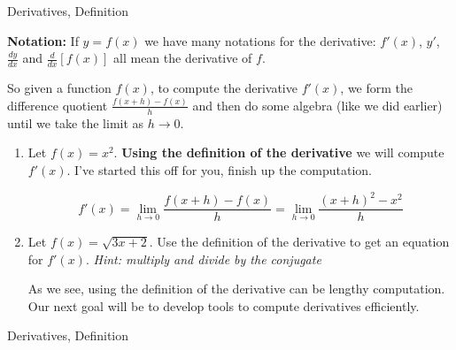 
\begin{tagblock}{Derivatives, Definition}
\begin{question}
	

\bigskip

\textbf{Notation:}  If $y=f(x)$ we have many notations for the derivative:  $f'(x)$, $y'$, $\frac{dy}{dx}$ and $\frac{d}{dx}[f(x)]$ all mean the derivative of $f$.  



So given a function $f(x)$, to compute the derivative $f'(x)$, we form the difference quotient $\displaystyle \frac{f(x+h)-f(x)}{h}$ and then do some algebra (like we did earlier) until we take the limit as $h \to 0$.  





\begin{enumerate}

\item Let $f(x) = x^2$.  \textbf{Using the definition of the derivative} we will compute $f'(x)$.  I've started this off for you, finish up the computation.  

\[f'(x) = \lim_{h \to 0} \frac{f(x+h) - f(x)}{h} =  \lim_{h \to 0} \frac{(x+h)^2 - x^2}{h} \]


\vspace{5in}



\item Let $f(x) = \sqrt{3x+2}$.  Use the definition of the derivative to get an equation for $f'(x)$.  \emph{Hint: multiply and divide by the conjugate}

\vfill  As we see, using the definition of the derivative can be lengthy computation.  Our next goal will be to develop tools to compute derivatives efficiently.  

\end{enumerate}

\bigskip


	
	
\begin{tags}
	    Derivatives, Definition
\end{tags}
	
\begin{diary}
\end{diary}
	
\begin{solution}
	   
\end{solution}
	
\end{question}

\end{tagblock}


